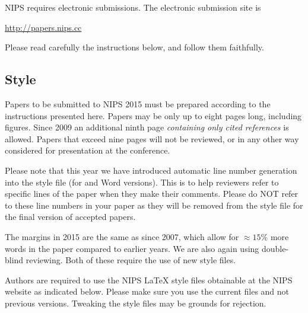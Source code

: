 \documentclass{article} %
\begin{document}
NIPS requires electronic submissions.  The electronic submission site is  
\begin{center}
   \url{http://papers.nips.cc}
\end{center}

Please read carefully the
instructions below, and follow them faithfully.
\subsection{Style}

Papers to be submitted to NIPS 2015 must be prepared according to the
instructions presented here. Papers may be only up to eight pages long,
including figures. Since 2009 an additional ninth page \textit{containing only
cited references} is allowed. Papers that exceed nine pages will not be
reviewed, or in any other way considered for presentation at the conference.

Please note that this year we have introduced automatic line number generation
into the style file (for \LaTeXe and Word versions). This is to help reviewers
refer to specific lines of the paper when they make their comments. Please do
NOT refer to these line numbers in your paper as they will be removed from the
style file for the final version of accepted papers.

The margins in 2015 are the same as since 2007, which allow for $\approx 15\%$
more words in the paper compared to earlier years. We are also again using 
double-blind reviewing. Both of these require the use of new style files.

Authors are required to use the NIPS \LaTeX{} style files obtainable at the
NIPS website as indicated below. Please make sure you use the current files and
not previous versions. Tweaking the style files may be grounds for rejection.



\end{document}
